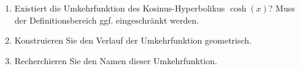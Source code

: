 \begin{ExerciseBlock}
\begin{enumerate}[label=\alph*)]
	
	\item Existiert die Umkehrfunktion des Kosinus-Hyperbolikus $\cosh(x)$? Muss der Definitionsbereich ggf. eingeschränkt werden.	
	
	\item Konstruieren Sie den Verlauf der Umkehrfunktion geometrisch.
	
	\item Recherchieren Sie den Namen dieser Umkehrfunktion.
	
\end{enumerate}

\end{ExerciseBlock}
